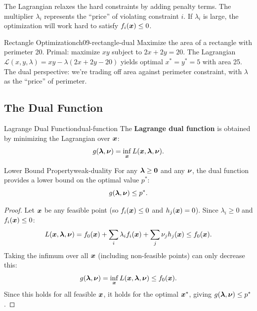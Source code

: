 \documentclass[../../main.tex]{subfiles}
\begin{document}
\begin{intuition}
The Lagrangian relaxes the hard constraints by adding penalty terms. The multiplier $\lambda_i$ represents the ``price'' of violating constraint $i$. If $\lambda_i$ is large, the optimization will work hard to satisfy $f_i(\boldsymbol{x}) \leq 0$.
\end{intuition}

\begin{example}{Rectangle Optimization}{ch09-rectangle-dual}
Maximize the area of a rectangle with perimeter 20. Primal: maximize $xy$ subject to $2x + 2y = 20$. The Lagrangian $\mathcal{L}(x,y,\lambda) = xy - \lambda(2x + 2y - 20)$ yields optimal $x^* = y^* = 5$ with area 25. The dual perspective: we're trading off area against perimeter constraint, with $\lambda$ as the ``price'' of perimeter.
\end{example}

\subsection{The Dual Function}

\begin{definition}{Lagrange Dual Function}{dual-function}
The \textbf{Lagrange dual function} is obtained by minimizing the Lagrangian over $\boldsymbol{x}$:
\[
    g(\boldsymbol{\lambda}, \boldsymbol{\nu}) = \inf_{\boldsymbol{x}} L(\boldsymbol{x}, \boldsymbol{\lambda}, \boldsymbol{\nu}).
\]
\end{definition}

\begin{theorem}{Lower Bound Property}{weak-duality}
For any $\boldsymbol{\lambda} \geq \boldsymbol{0}$ and any $\boldsymbol{\nu}$, the dual function provides a lower bound on the optimal value $p^*$:
\[
    g(\boldsymbol{\lambda}, \boldsymbol{\nu}) \leq p^*.
\]
\end{theorem}

\begin{proof}
Let $\boldsymbol{x}$ be any feasible point (so $f_i(\boldsymbol{x}) \leq 0$ and $h_j(\boldsymbol{x}) = 0$). Since $\lambda_i \geq 0$ and $f_i(\boldsymbol{x}) \leq 0$:
\[
    L(\boldsymbol{x}, \boldsymbol{\lambda}, \boldsymbol{\nu}) = f_0(\boldsymbol{x}) + \sum_i \lambda_i f_i(\boldsymbol{x}) + \sum_j \nu_j h_j(\boldsymbol{x}) \leq f_0(\boldsymbol{x}).
\]
Taking the infimum over all $\boldsymbol{x}$ (including non-feasible points) can only decrease this:
\[
    g(\boldsymbol{\lambda}, \boldsymbol{\nu}) = \inf_{\boldsymbol{x}} L(\boldsymbol{x}, \boldsymbol{\lambda}, \boldsymbol{\nu}) \leq f_0(\boldsymbol{x}).
\]
Since this holds for all feasible $\boldsymbol{x}$, it holds for the optimal $\boldsymbol{x}^*$, giving $g(\boldsymbol{\lambda}, \boldsymbol{\nu}) \leq p^*$.
\end{proof}
\end{document}
